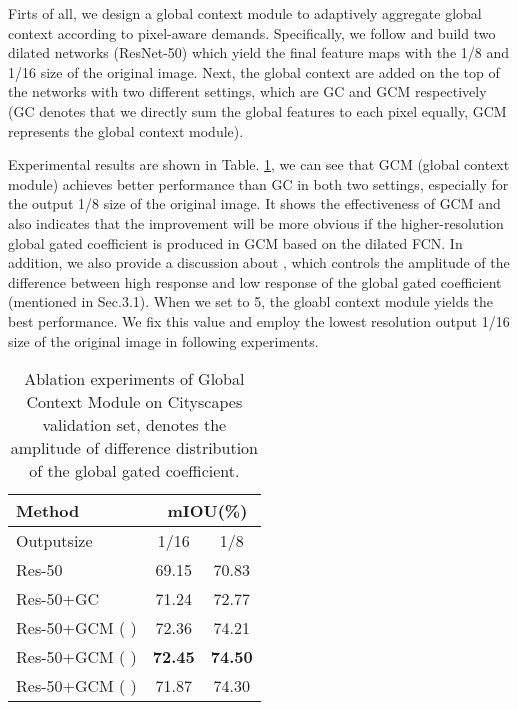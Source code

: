 \documentclass[10pt,twocolumn,letterpaper]{article}
\begin{document}
 Firts of all, we design a global context module to adaptively aggregate global context according to pixel-aware demands. 
Specifically, we follow \cite{deeplabv2} and build two dilated networks (ResNet-50) which yield the final feature maps with the 1/8 and 1/16 size of the original image. Next, the global context are added on the top of the networks with two different settings, which are  GC and GCM respectively (GC denotes that we directly sum the global features to each pixel equally, GCM represents  the global context module).

Experimental results are shown in Table. \ref{globalT}, we can see that GCM (global context module) achieves better performance than GC in both two settings,  especially for the output 1/8 size of the original image. It shows the effectiveness of GCM and also indicates that the improvement will be more obvious if the higher-resolution  global gated coefficient is produced in GCM based on the dilated FCN.
In addition, we also provide a discussion about , which controls the amplitude of the difference between high response and low response of the global gated coefficient (mentioned in Sec.3.1). When we set  to 5, the gloabl context module yields the best performance. We fix this value and employ  the lowest resolution output 1/16 size of the original image in following experiments.


\begin{table}[t]
\begin{center}
\begin{tabular}{l|c|c}
\toprule
Method & \multicolumn{2}{c}{\ mIOU(\%)}\\
\hline
Outputsize &1/16& 1/8\\
\hline
\hline
 \noalign{\smallskip}
Res-50 & 69.15& 70.83\\
Res-50+GC & 71.24& 72.77\\
\hline
 \noalign{\smallskip}
Res-50+GCM ( )& 72.36 & 74.21\\
Res-50+GCM ( )& \textbf{72.45}&\textbf{74.50}\\
Res-50+GCM ( )& 71.87& 74.30\\
\hline
\bottomrule
\end{tabular}
\end{center}
\caption{Ablation experiments of Global Context Module on Cityscapes validation set,  denotes the amplitude of difference distribution of the global gated coefficient.}
\label{globalT}
\end{table}
\end{document}
